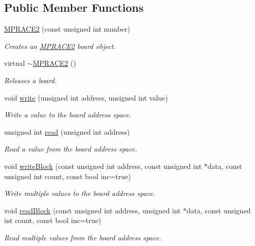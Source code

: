 \subsection*{Public Member Functions}
\begin{CompactItemize}
\item 
\hyperlink{classmprace_1_1MPRACE2_a0}{MPRACE2} (const unsigned int number)
\begin{CompactList}\small\item\em Creates an \hyperlink{classmprace_1_1MPRACE2}{MPRACE2} board object. \item\end{CompactList}\item 
virtual \hyperlink{classmprace_1_1MPRACE2_a1}{$\sim$MPRACE2} ()
\begin{CompactList}\small\item\em Releases a board. \item\end{CompactList}\item 
void \hyperlink{classmprace_1_1MPRACE2_a2}{write} (unsigned int address, unsigned int value)
\begin{CompactList}\small\item\em Write a value to the board address space. \item\end{CompactList}\item 
unsigned int \hyperlink{classmprace_1_1MPRACE2_a3}{read} (unsigned int address)
\begin{CompactList}\small\item\em Read a value from the board address space. \item\end{CompactList}\item 
void \hyperlink{classmprace_1_1MPRACE2_a4}{write\-Block} (const unsigned int address, const unsigned int $\ast$data, const unsigned int count, const bool inc=true)
\begin{CompactList}\small\item\em Write multiple values to the board address space. \item\end{CompactList}\item 
void \hyperlink{classmprace_1_1MPRACE2_a5}{read\-Block} (const unsigned int address, unsigned int $\ast$data, const unsigned int count, const bool inc=true)
\begin{CompactList}\small\item\em Read multiple values from the board address space. \item\end{CompactList}\item 

\end{CompactItemize}
